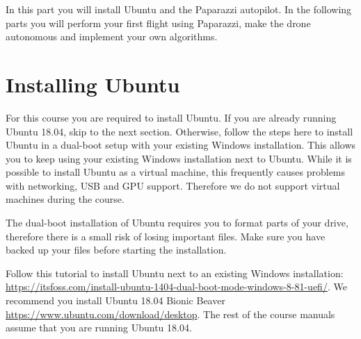 \documentclass{article}
\begin{document}

In this part you will install Ubuntu and the Paparazzi autopilot.
In the following parts you will perform your first flight using Paparazzi, make the drone autonomous and implement your own algorithms.


\section{Installing Ubuntu}
For this course you are required to install Ubuntu.
If you are already running Ubuntu 18.04, skip to the next section.
Otherwise, follow the steps here to install Ubuntu in a dual-boot setup with your existing Windows installation.
This allows you to keep using your existing Windows installation next to Ubuntu.
While it is possible to install Ubuntu as a virtual machine, this frequently causes problems with networking, USB and GPU support. Therefore we do not support virtual machines during the course.

The dual-boot installation of Ubuntu requires you to format parts of your drive, therefore there is a small risk of losing important files.
Make sure you have backed up your files before starting the installation.

Follow this tutorial to install Ubuntu next to an existing Windows installation: \url{https://itsfoss.com/install-ubuntu-1404-dual-boot-mode-windows-8-81-uefi/}. We recommend you install Ubuntu 18.04 Bionic Beaver \url{https://www.ubuntu.com/download/desktop}. The rest of the course manuals assume that you are running Ubuntu 18.04.
\end{document}
